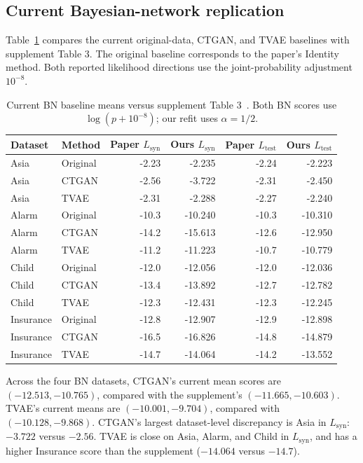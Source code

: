 \documentclass[11pt,letterpaper]{article}
\newcommand{\Lsyn}{L_{\mathrm{syn}}}
\newcommand{\Ltest}{L_{\mathrm{test}}}
\begin{document}
\subsection{Current Bayesian-network replication}
Table~\ref{tab:bncomparison} compares the current original-data, CTGAN, and TVAE baselines with supplement Table 3. The original baseline corresponds to the paper's Identity method. Both reported likelihood directions use the joint-probability adjustment $10^{-8}$.
\begin{table}[H]\centering
\caption{Current BN baseline means versus supplement Table 3~\cite{xusupplement}. Both BN scores use $\log(p+10^{-8})$; our refit uses $\alpha=1/2$.}\label{tab:bncomparison}
\small
\begin{tabular}{llrrrr}\toprule
Dataset & Method & Paper $\Lsyn$ & Ours $\Lsyn$ & Paper $\Ltest$ & Ours $\Ltest$\\\midrule
Asia & Original & -2.23 & -2.235 & -2.24 & -2.223\\
Asia & CTGAN & -2.56 & -3.722 & -2.31 & -2.450\\
Asia & TVAE & -2.31 & -2.288 & -2.27 & -2.240\\
Alarm & Original & -10.3 & -10.240 & -10.3 & -10.310\\
Alarm & CTGAN & -14.2 & -15.613 & -12.6 & -12.950\\
Alarm & TVAE & -11.2 & -11.223 & -10.7 & -10.779\\
Child & Original & -12.0 & -12.056 & -12.0 & -12.036\\
Child & CTGAN & -13.4 & -13.892 & -12.7 & -12.782\\
Child & TVAE & -12.3 & -12.431 & -12.3 & -12.245\\
Insurance & Original & -12.8 & -12.907 & -12.9 & -12.898\\
Insurance & CTGAN & -16.5 & -16.826 & -14.8 & -14.879\\
Insurance & TVAE & -14.7 & -14.064 & -14.2 & -13.552\\
\bottomrule\end{tabular}
\end{table}
Across the four BN datasets, CTGAN's current mean scores are $(-12.513,-10.765)$, compared with the supplement's $(-11.665,-10.603)$. TVAE's current means are $(-10.001,-9.704)$, compared with $(-10.128,-9.868)$. CTGAN's largest dataset-level discrepancy is Asia in $\Lsyn$: $-3.722$ versus $-2.56$. TVAE is close on Asia, Alarm, and Child in $\Lsyn$, and has a higher Insurance score than the supplement ($-14.064$ versus $-14.7$).
\end{document}

